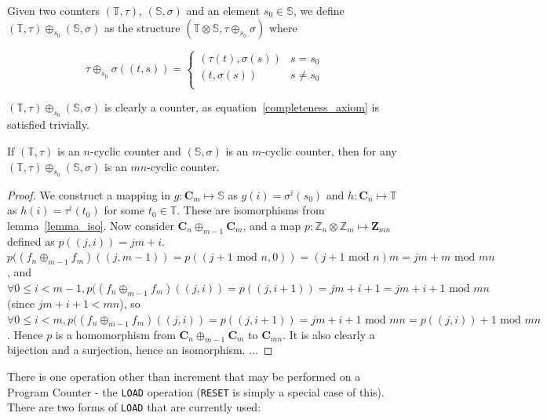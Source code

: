 \documentclass[5p, twocolumn]{elsarticle}
\begin{document}
\begin{definition}
Given two counters  $(\mathbb{T},\tau)$, $(\mathbb{S},\sigma)$ and an element $s_0\in \mathbb{S}$, we define $(\mathbb{T},\tau)\oplus_{s_0}(\mathbb{S},\sigma)$ as the structure $(\mathbb{T}\otimes\mathbb{S},\tau\oplus_{s_0}\sigma)$ where

\begin{equation}
\tau\oplus_{s_0}\sigma((t,s))=
\begin{cases}
(\tau(t),\sigma(s)) & s=s_0 \\
(t,\sigma(s)) & s\neq s_0 \\
\end{cases}
\end{equation}
\end{definition}

$(\mathbb{T},\tau)\oplus_{s_0}(\mathbb{S},\sigma)$ is clearly a counter, as equation~\ref{completeness_axiom} is satisfied trivially.

\begin{theorem}
If $(\mathbb{T},\tau)$ is an $n$-cyclic counter and $(\mathbb{S},\sigma)$ is an $m$-cyclic counter, then for any $(\mathbb{T},\tau)\oplus_{s_0}(\mathbb{S},\sigma)$ is an $mn$-cyclic counter.
\label{counter_concat}
\end{theorem}

\begin{proof}
We construct a mapping in $g:\mathbf{C}_m\mapsto\mathbb{S}$ as $g(i)=\sigma^i(s_0)$ and $h:\mathbf{C}_n\mapsto\mathbb{T}$ as $h(i)=\tau^i(t_0)$ for some $t_0\in\mathbb{T}$. These are isomorphisms from lemma~\ref{lemma_iso}. Now consider $\mathbf{C}_n\oplus_{m-1}\mathbf{C}_m$, and a map $p:\mathbb{Z}_n\otimes\mathbb{Z}_m\mapsto\mathbf{Z}_{mn}$ defined as $p((j,i))=jm+i$. $p((f_n\oplus_{m-1} f_m)((j,m-1))=p((j+1\text{ mod }n,0))=(j+1\text{ mod }n)m=jm+m\text{ mod }mn$, and $\forall 0\leq i<m-1, p((f_n\oplus_{m-1} f_m)((j,i))=p((j,i+1))=jm+i+1=jm+i+1\text{ mod }mn$ (since $jm+i+1<mn$), so $\forall 0\leq i<m, p((f_n\oplus_{m-1}f_m)((j,i))=p((j,i+1))=jm+i+1\text{ mod }mn=p((j,i))+1\text{ mod }mn$. Hence $p$ is a homomorphism from $\mathbf{C}_n\oplus_{m-1}\mathbf{C}_m$ to $\mathbf{C}_{mn}$. It is also clearly a bijection and a surjection, hence an isomorphism. ... %
\end{proof}

There is one operation other than increment that may be performed on a Program Counter - the \verb+LOAD+ operation (\verb+RESET+ is simply a special case of this). There are two forms of \verb+LOAD+ that are currently used:
\end{document}
